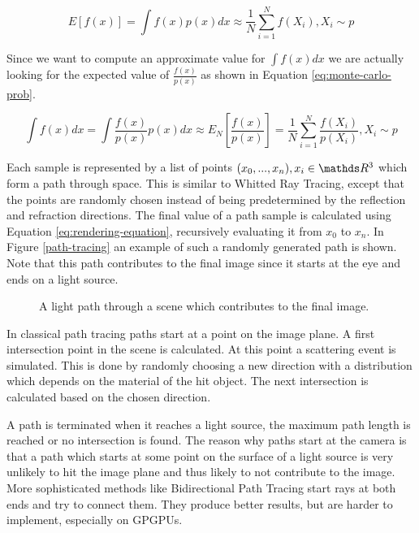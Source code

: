 \documentclass{ACGSeminar}
\begin{document}
\begin{equation}\label{eq:monte-carlo}
E[f(x)] = \int{f(x)p(x)dx} \approx \frac{1}{N} \sum_{i=1}^{N}{ f(X_i) }   , X_i \sim p 
\end{equation}

Since we want to compute an approximate value for $\int{f(x)dx}$ we are actually looking for the expected value of $\frac{f(x)}{p(x)}$ as shown in Equation \eqref{eq:monte-carlo-prob}.

\begin{equation}\label{eq:monte-carlo-prob}
\int{f(x)dx} = \int{\frac{f(x)}{p(x)}p(x)dx} \approx E_N[\frac{f(x)}{p(x)}] = \frac{1}{N} \sum_{i=1}^{N}{ \frac{f(X_i)}{p(X_i)} }   , X_i \sim p 
\end{equation}

Each sample is represented by a list of points $(x_0, ..., x_n), x_i \in \R^3$ which form a path through space. This is similar to Whitted Ray Tracing, except that the points are randomly chosen instead of being predetermined by the reflection and refraction directions. The final value of a path sample is calculated using Equation \eqref{eq:rendering-equation}, recursively evaluating it from $x_0$ to $x_n$. 
In Figure \ref{path-tracing} an example of such a randomly generated path is shown. Note that this path contributes to the final image since it starts at the eye and ends on a light source.

\begin{figure}[htb!]
  \centering
  
  \caption{A light path through a scene which contributes to the final image.}
  \label{fig:light-path}
\end{figure}

In classical path tracing paths start at a point on the image plane. A first intersection point in the scene is calculated. At this point a scattering event is simulated. This is done by randomly choosing a new direction with a distribution which depends on the material of the hit object. The next intersection is calculated based on the chosen direction.

A path is terminated when it reaches a light source, the maximum path length is reached or no intersection is found.
The reason why paths start at the camera is that a path which starts at some point on the surface of a light source is very unlikely to hit the image plane and thus likely to not contribute to the image. More sophisticated methods like Bidirectional Path Tracing start rays at both ends and try to connect them. They produce better results, but are harder to implement, especially on GPGPUs.
\end{document}
